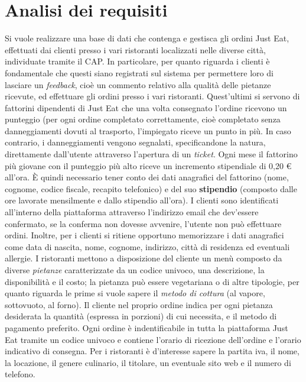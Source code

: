 \documentclass[10pt]{article}
\begin{document}
	\section{Analisi dei requisiti}
	Si vuole realizzare una base di dati che contenga e gestisca gli ordini Just Eat\texttrademark{}, effettuati dai clienti presso i vari ristoranti localizzati nelle diverse citt\`a, individuate tramite il CAP. In particolare, per quanto riguarda i clienti \`e fondamentale che questi siano registrati sul sistema per permettere loro di lasciare un \textit{feedback}, cio\`e un commento relativo alla qualit\`a delle pietanze ricevute, ed effettuare gli ordini presso i vari ristoranti. Quest'ultimi si servono di fattorini\footnotemark{} dipendenti di Just Eat\texttrademark{} che una volta consegnato l'ordine ricevono un punteggio (per ogni ordine completato correttamente, cio\`e completato senza danneggiamenti dovuti al trasporto, l'impiegato riceve un punto in più. In caso contrario, i danneggiamenti vengono segnalati, specificandone la natura, direttamente dall'utente attraverso l'apertura di un \textit{ticket}. Ogni mese il fattorino più giovane con il punteggio più alto riceve un incremento stipendiale di 0,20 \euro{} all'ora. \`E quindi necessario tener conto dei dati anagrafici del fattorino (nome, cognome, codice fiscale, recapito telefonico) e del suo \textbf{stipendio} (composto dalle ore lavorate mensilmente e dallo stipendio all'ora). I clienti sono identificati all'interno della piattaforma attraverso l'indirizzo email che dev'essere confermato, se la conferma non dovesse avvenire, l'utente non può effettuare ordini. Inoltre, per i clienti si ritiene opportuno memorizzare i dati anagrafici come data di nascita, nome, cognome, indirizzo, citt\`a di residenza ed eventuali allergie. I ristoranti mettono a disposizione del cliente un men\`u composto da diverse \textit{pietanze} caratterizzate da un codice univoco, una descrizione, la disponibilit\`a e il costo; la pietanza può essere vegetariana o di altre tipologie, per quanto riguarda le prime si vuole sapere il \textit{metodo di cottura} (al vapore, sottovuoto, al forno). Il cliente nel proprio ordine indica per ogni pietanza desiderata la quantit\`a (espressa in porzioni) di cui necessita, e il metodo di pagamento preferito. Ogni ordine \`e indentificabile in tutta la piattaforma Just Eat\texttrademark{} tramite un codice univoco e contiene l'orario di ricezione dell'ordine e l'orario indicativo di consegna. Per i ristoranti \`e d'interesse sapere la partita iva, il nome, la locazione, il genere culinario, il titolare, un eventuale sito web e il numero di telefono.
\end{document}
